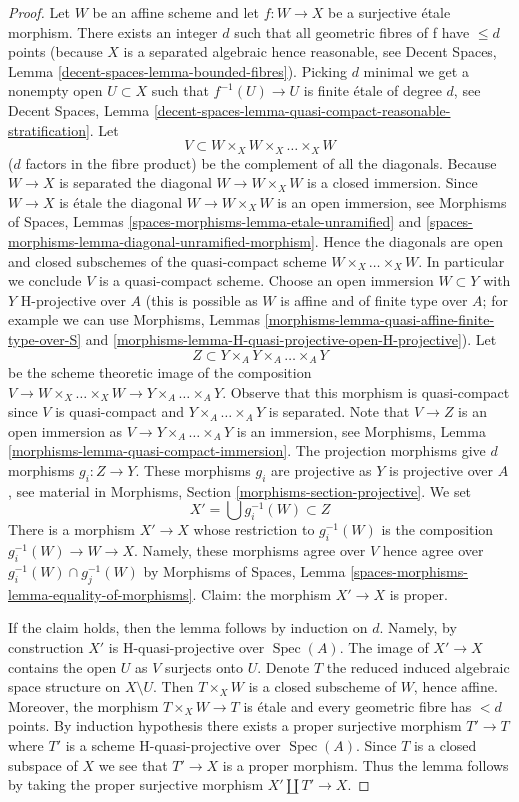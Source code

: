 \documentclass[10pt,a4paper]{amsart}
\theoremstyle{plain}
\theoremstyle{definition}
\theoremstyle{remark}
\numberwithin{equation}{subsection}
\def\Spec{\mathop{\mathrm{Spec}}}
\begin{document}
\begin{proof}
Let $W$ be an affine scheme and let $f : W \to X$ be a surjective
\'etale morphism. There exists an integer $d$ such that all geometric
fibres of f have $\leq d$ points (because $X$ is a separated algebraic
hence reasonable, see
Decent Spaces, Lemma \ref{decent-spaces-lemma-bounded-fibres}).
Picking $d$ minimal we get a nonempty open $U \subset X$ such that
$f^{-1}(U) \to U$ is finite \'etale of degree $d$, see
Decent Spaces, Lemma
\ref{decent-spaces-lemma-quasi-compact-reasonable-stratification}.
Let
$$
V \subset W \times_X W \times_X \ldots \times_X W
$$
($d$ factors in the fibre product) be the complement of all the diagonals.
Because $W \to X$ is separated the diagonal $W \to W \times_X W$ is a
closed immersion. Since $W \to X$ is \'etale the diagonal
$W \to W \times_X W$ is an open immersion, see
Morphisms of Spaces, Lemmas
\ref{spaces-morphisms-lemma-etale-unramified} and
\ref{spaces-morphisms-lemma-diagonal-unramified-morphism}.
Hence the diagonals are open and closed subschemes
of the quasi-compact scheme $W \times_X \ldots \times_X W$.
In particular we conclude $V$ is a quasi-compact scheme.
Choose an open immersion $W \subset Y$ with $Y$ H-projective over
$A$ (this is possible as $W$ is affine and of finite type over $A$;
for example we can use
Morphisms, Lemmas
\ref{morphisms-lemma-quasi-affine-finite-type-over-S} and
\ref{morphisms-lemma-H-quasi-projective-open-H-projective}).
Let
$$
Z \subset Y \times_A Y \times_A \ldots \times_A Y
$$
be the scheme theoretic image of the composition
$V \to W \times_X \ldots \times_X W \to Y \times_A \ldots \times_A Y$.
Observe that this morphism is quasi-compact since $V$ is quasi-compact
and $Y \times_A \ldots \times_A Y$ is separated.
Note that $V \to Z$ is an open immersion as
$V \to Y \times_A \ldots \times_A Y$ is an immersion, see
Morphisms, Lemma \ref{morphisms-lemma-quasi-compact-immersion}.
The projection morphisms give $d$ morphisms $g_i : Z \to Y$.
These morphisms $g_i$ are projective as $Y$ is projective over $A$, see
material in Morphisms, Section \ref{morphisms-section-projective}.
We set
$$
X' = \bigcup g_i^{-1}(W) \subset Z
$$
There is a morphism $X' \to X$ whose restriction to $g_i^{-1}(W)$ is
the composition $g_i^{-1}(W) \to W \to X$.
Namely, these morphisms agree over $V$ hence agree over
$g_i^{-1}(W) \cap g_j^{-1}(W)$ by
Morphisms of Spaces, Lemma \ref{spaces-morphisms-lemma-equality-of-morphisms}.
Claim: the morphism $X' \to X$ is proper.

\medskip\noindent
If the claim holds, then the lemma follows by induction on $d$.
Namely, by construction $X'$ is H-quasi-projective over $\Spec(A)$.
The image of $X' \to X$ contains the open $U$ as $V$ surjects onto $U$.
Denote $T$ the reduced induced algebraic space structure on $X \setminus U$.
Then $T \times_X W$ is a closed subscheme of $W$, hence affine.
Moreover, the morphism $T \times_X W \to T$ is \'etale and every geometric
fibre has $< d$ points. By induction hypothesis there exists a proper
surjective morphism $T' \to T$ where $T'$ is a scheme H-quasi-projective
over $\Spec(A)$. Since $T$ is a closed subspace of $X$ we see that
$T' \to X$ is a proper morphism. Thus the lemma follows by taking the
proper surjective morphism $X' \amalg T' \to X$.


\end{proof}
\end{document}
